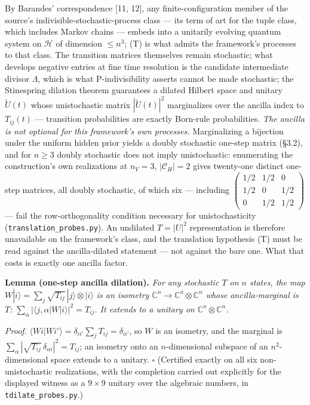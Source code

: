 \documentclass[
]{article}
\begin{document}
By Barandes' correspondence {[}11, 12{]}, any finite-configuration
member of the source's indivisible-stochastic-process class --- its term
of art for the tuple class, which includes Markov chains --- embeds into
a unitarily evolving quantum system on \(\mathcal{H}\) of dimension
\(\leq n^3\); (T) is what admits the framework's processes to that
class. The transition matrices themselves remain stochastic; what
develops negative entries at fine time resolution is the candidate
intermediate divisor \(\Lambda\), which is what P-indivisibility asserts
cannot be made stochastic; the Stinespring dilation theorem guarantees a
dilated Hilbert space and unitary \(\tilde U(t)\) whose unistochastic
matrix \(|\tilde U(t)|^2\) marginalizes over the ancilla index to
\(T_{ij}(t)\) --- transition probabilities are exactly Born-rule
probabilities. \emph{The ancilla is not optional for this framework's
own processes.} Marginalizing a bijection under the uniform hidden prior
yields a doubly stochastic one-step matrix (§3.2), and for \(n \geq 3\)
doubly stochastic does not imply unistochastic: enumerating the
construction's own realizations at \(n_V = 3\), \(|\mathcal{C}_H| = 2\)
gives twenty-one distinct one-step matrices, all doubly stochastic, of
which six --- including
\(\left(\begin{smallmatrix} 1/2 & 1/2 & 0 \\ 1/2 & 0 & 1/2 \\ 0 & 1/2 & 1/2 \end{smallmatrix}\right)\)
--- fail the row-orthogonality condition necessary for unistochasticity
(\texttt{translation\_probes.py}). An undilated \(T = |U|^2\)
representation is therefore unavailable on the framework's class, and
the translation hypothesis (T) must be read against the ancilla-dilated
statement --- not against the bare one. What that costs is exactly one
ancilla factor.

\textbf{Lemma (one-step ancilla dilation).} \emph{For any stochastic
\(T\) on \(n\) states, the map
\(W|i\rangle = \sum_j \sqrt{T_{ij}}\,|j\rangle \otimes |i\rangle\) is an
isometry \(\mathbb{C}^n \to \mathbb{C}^n \otimes \mathbb{C}^n\) whose
ancilla-marginal is \(T\):
\(\sum_\alpha |\langle j, \alpha | W | i \rangle|^2 = T_{ij}\). It
extends to a unitary on \(\mathbb{C}^n \otimes \mathbb{C}^n\).}

\emph{Proof.}
\(\langle W i | W i' \rangle = \delta_{ii'} \sum_j T_{ij} = \delta_{ii'}\),
so \(W\) is an isometry, and the marginal is
\(\sum_\alpha |\sqrt{T_{ij}}\,\delta_{\alpha i}|^2 = T_{ij}\); an
isometry onto an \(n\)-dimensional subspace of an \(n^2\)-dimensional
space extends to a unitary. \(\square\) (Certified exactly on all six
non-unistochastic realizations, with the completion carried out
explicitly for the displayed witness as a \(9 \times 9\) unitary over
the algebraic numbers, in \texttt{tdilate\_probes.py}.)
\end{document}

